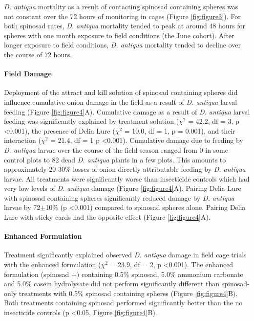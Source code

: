 \documentclass[alpha-refs]{wiley-article}
\begin{document}
\textit{D. antiqua} mortality as a result of contacting spinosad containing spheres was not constant over the 72 hours of monitoring in cages (Figure \ref{fig:figure3}).  For both spinosad rates, \textit{D. antiqua} mortality tended to peak at around 48 hours for spheres with one month exposure to field conditions (the June cohort).  After longer exposure to field conditions, \textit{D. antiqua} mortality tended to decline over the course of 72 hours.  

\paragraph{Field Damage}

Deployment of the attract and kill solution of spinosad containing spheres did influence cumulative onion damage in the field as a result of \textit{D. antiqua} larval feeding (Figure \ref{fig:figure4}A).  Cumulative damage as a result of \textit{D. antiqua} larval feeding was significantly explained by treatment solution ($\chi^2$ = 42.2, df = 3, p \textless 0.001), the presence of Delia Lure ($\chi^2$ = 10.0, df = 1, p = 0.001), and their interaction ($\chi^2$ = 21.4, df = 1 p \textless 0.001).  Cumulative damage due to feeding by \textit{D. antiqua} larvae over the course of the field season ranged from 0 in some control plots to 82 dead \textit{D. antiqua} plants in a few plots. This amounts to approximately 20-30\% losses of onion directly attributable feeding by \textit{D. antiqua} larvae.  All treatments were significantly worse than insecticide controls which had very low levels of \textit{D. antiqua} damage (Figure \ref{fig:figure4}A).  Pairing Delia Lure with spinosad containing spheres significantly reduced damage by \textit{D. antiqua} larvae by 72$\pm$10\% (p \textless 0.001) compared to spinosad spheres alone.  Pairing Delia Lure with sticky cards had the opposite effect (Figure \ref{fig:figure4}A).

\paragraph{Enhanced Formulation}

Treatment significantly explained observed \textit{D. antiqua} damage in field cage trials with the enhanced formulation ($\chi^2$ = 23.9, df = 2, p \textless 0.001).  The enhanced formulation (spinosad +) containing 0.5\% spinosad, 5.0\% ammonium carbonate and 5.0\% casein hydrolysate did not perform significantly different than spinosad-only treatments with 0.5\% spinosad containing spheres (Figure \ref{fig:figure4}B).  Both treatments containing spinosad performed significantly better than the no insecticide controls (p \textless 0.05, Figure \ref{fig:figure4}B).  
\end{document}
